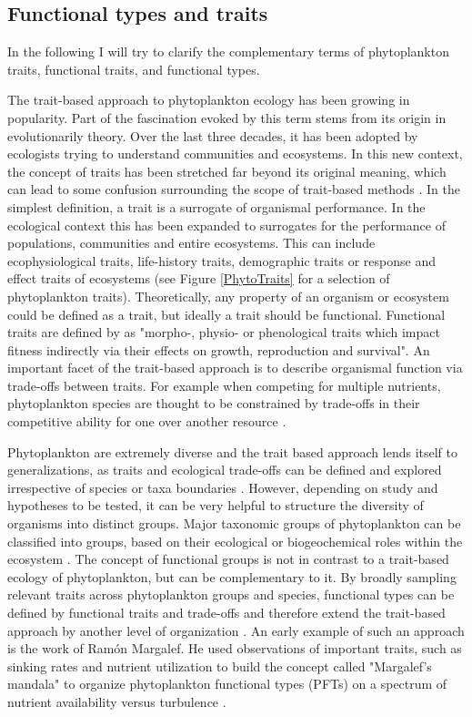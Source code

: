 \subsection{Functional types and traits}
In the following I will try to clarify the complementary terms of phytoplankton traits, functional traits, and functional types. 

The trait-based approach to phytoplankton ecology has been growing in popularity. Part of the fascination evoked by this term stems from its origin in evolutionarily theory. Over the last three decades, it has been adopted by ecologists trying to understand communities and ecosystems. In this new context, the concept of traits has been stretched far beyond its original meaning, which can lead to some confusion surrounding the scope of trait-based methods \citep{Violle2007c}. In the simplest definition, a trait is a surrogate of organismal performance. In the ecological context this has been expanded to surrogates for the performance of populations, communities and entire ecosystems. This can include ecophysiological traits, life-history traits, demographic traits or response and effect traits of ecosystems (see Figure \ref{PhytoTraits} for a selection of phytoplankton traits). Theoretically, any property of an organism or ecosystem could be defined as a trait, but ideally a trait should be functional. Functional traits are defined by \cite{Violle2007c} as "morpho-, physio- or phenological traits which impact fitness indirectly via their effects on growth, reproduction and survival". An important facet of the trait-based approach is to describe organismal function via trade-offs between traits. For example when competing for multiple nutrients, phytoplankton species are thought to be constrained by trade-offs in their competitive ability for one over another resource \citep{Tilman1990}. 

Phytoplankton are extremely diverse and the trait based approach lends itself to generalizations, as traits and ecological trade-offs can be defined and explored irrespective of species or taxa boundaries \citep{McGill2006}. However, depending on study and hypotheses to be tested, it can be very helpful to structure the diversity of organisms into distinct groups. Major taxonomic groups of phytoplankton can be classified into groups, based on their ecological or biogeochemical roles within the ecosystem \citep{Iglesias-Rodriguez2002,Flynn2015}. The concept of functional groups is not in contrast to a trait-based ecology of phytoplankton, but can be complementary to it. By broadly sampling relevant traits across phytoplankton groups and species, functional types can be defined by functional traits and trade-offs and therefore extend the trait-based approach by another level of organization \citep{Litchman2007d}. An early example of such an approach is the work of Ramón Margalef. He used observations of important traits, such as sinking rates and nutrient utilization to build the concept called "Margalef's mandala" to organize phytoplankton functional types (PFTs) on a spectrum of nutrient availability versus turbulence \citep{Margalef1978}. 


